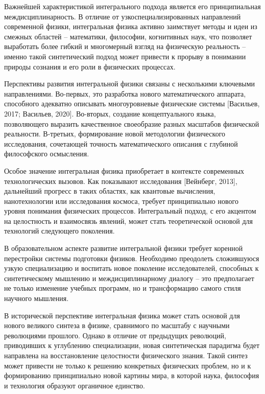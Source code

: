     Важнейшей характеристикой интегрального подхода является его принципиальная междисциплинарность. В отличие от узкоспециализированных направлений современной физики, интегральная физика активно заимствует методы и идеи из смежных областей – математики, философии, когнитивных наук, что позволяет выработать более гибкий и многомерный взгляд на физическую реальность – именно такой синтетический подход может привести к прорыву в понимании природы сознания и его роли в физических процессах.

    Перспективы развития интегральной физики связаны с несколькими ключевыми направлениями. Во-первых, это разработка нового математического аппарата, способного адекватно описывать многоуровневые физические системы [Васильев, 2017; Васильев, 2020]. Во-вторых, создание концептуального языка, позволяющего выразить качественное своеобразие разных масштабов физической реальности. В-третьих, формирование новой методологии физического исследования, сочетающей точность математического описания с глубиной философского осмысления.

    Особое значение интегральная физика приобретает в контексте современных технологических вызовов. Как показывают исследования [Вейнберг, 2013], дальнейший прогресс в таких областях, как квантовые вычисления, нанотехнологии или исследования космоса, требует принципиально нового уровня понимания физических процессов. Интегральный подход, с его акцентом на целостность и взаимосвязь явлений, может стать теоретической основой для технологий следующего поколения.

    В образовательном аспекте развитие интегральной физики требует коренной перестройки системы подготовки физиков. Необходимо преодолеть сложившуюся узкую специализацию и воспитать новое поколение исследователей, способных к синтетическому мышлению и междисциплинарному диалогу – это предполагает не только изменение учебных программ, но и трансформацию самого стиля научного мышления.

    В исторической перспективе интегральная физика может стать основой для нового великого синтеза в физике, сравнимого по масштабу с научными революциями прошлого. Однако в отличие от предыдущих революций, приводивших к углублению специализации, новая синтетическая парадигма будет направлена на восстановление целостности физического знания. Такой синтез может привести не только к решению конкретных физических проблем, но и к формированию принципиально новой картины мира, в которой наука, философия и технология образуют органичное единство.

